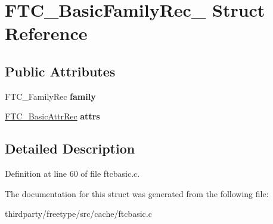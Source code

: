 \hypertarget{struct_f_t_c___basic_family_rec__}{}\section{F\+T\+C\+\_\+\+Basic\+Family\+Rec\+\_\+ Struct Reference}
\label{struct_f_t_c___basic_family_rec__}
\subsection*{Public Attributes}
\begin{DoxyCompactItemize}
\item 
\mbox{\label{struct_f_t_c___basic_family_rec___a8ec968ff70bb3fd60fbb711d8c72e2c1}} 
F\+T\+C\+\_\+\+Family\+Rec {\bfseries family}
\item 
\mbox{\label{struct_f_t_c___basic_family_rec___a84fe37c292128a29aaa6c30ee12e1963}} 
\hyperlink{struct_f_t_c___basic_attr_rec__}{F\+T\+C\+\_\+\+Basic\+Attr\+Rec} {\bfseries attrs}
\end{DoxyCompactItemize}


\subsection{Detailed Description}


Definition at line 60 of file ftcbasic.\+c.



The documentation for this struct was generated from the following file\+:\begin{DoxyCompactItemize}
\item 
thirdparty/freetype/src/cache/ftcbasic.\+c\end{DoxyCompactItemize}
